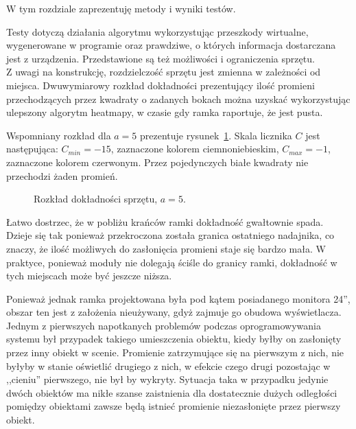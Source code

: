 \label{ch:tests}

W tym rozdziale zaprezentuję metody i wyniki testów.

Testy dotyczą działania algorytmu wykorzystując przeszkody wirtualne, wygenerowane w programie oraz prawdziwe, o których informacja dostarczana jest z urządzenia. Przedstawione są też możliwości i ograniczenia sprzętu.\\

Z uwagi na konstrukcję, rozdzielczość sprzętu jest zmienna w zależności od miejsca. Dwuwymiarowy rozkład dokładności prezentujący ilość promieni przechodzących przez kwadraty o zadanych bokach można uzyskać wykorzystując ulepszony algorytm heatmapy, w czasie gdy ramka raportuje, że jest pusta.

Wspomniany rozkład dla $a = 5$ prezentuje rysunek~\ref{fig:scene_heatmap2_resolution_5}. Skala licznika $C$ jest następująca: $C_{min} = -15$, zaznaczone kolorem ciemnoniebieskim, $C_{max} = -1$, zaznaczone kolorem czerwonym. Przez pojedynczych białe kwadraty nie przechodzi żaden promień.

\begin{figure}
 \centering
 \makebox[\textwidth][r]{
  \resizebox{.9\largefigure}{!}{
    \def\svgwidth{0.9\largefigure}
    
  }
 }
 \caption{Rozkład dokładności sprzętu, $a = 5$.}
 \label{fig:scene_heatmap2_resolution_5}
\end{figure}

Łatwo dostrzec, że w pobliżu krańców ramki dokładność gwałtownie spada. Dzieje się tak ponieważ przekroczona została granica ostatniego nadajnika, co znaczy, że ilość możliwych do zasłonięcia promieni staje się bardzo mała. W praktyce, ponieważ moduły nie dolegają ściśle do granicy ramki, dokładność w tych miejscach może być jeszcze niższa.

Ponieważ jednak ramka projektowana była pod kątem posiadanego monitora 24'', obszar ten jest z założenia nieużywany, gdyż zajmuje go obudowa wyświetlacza.\\

Jednym z pierwszych napotkanych problemów podczas oprogramowywania systemu był przypadek takiego umieszczenia obiektu, kiedy byłby on zasłonięty przez inny obiekt w scenie. Promienie zatrzymujące się  na pierwszym z nich, nie byłyby w stanie oświetlić drugiego z nich, w efekcie czego drugi pozostając w ,,cieniu'' pierwszego, nie był by wykryty. Sytuacja taka w przypadku jedynie dwóch obiektów ma nikłe szanse zaistnienia \pauza dla dostatecznie dużych odległości pomiędzy obiektami zawsze będą istnieć promienie niezasłonięte przez pierwszy obiekt.

